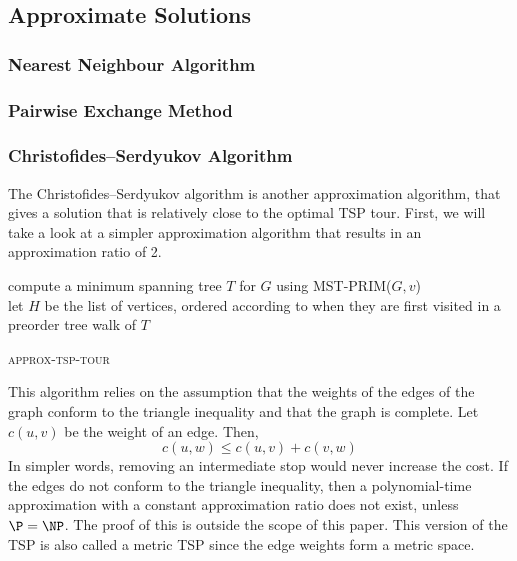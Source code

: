 \documentclass[11pt]{article}
\begin{document}
		
		
	\subsection{ Approximate Solutions}
		\subsubsection {Nearest Neighbour Algorithm}
    \subsubsection {Pairwise Exchange Method}
    \newpage
    \subsubsection {Christofides–Serdyukov Algorithm}
    The Christofides–Serdyukov algorithm is another approximation algorithm, that gives a solution that is 
    relatively close to the optimal TSP tour. First, we will take a look at a simpler approximation 
    algorithm that results in an approximation ratio of 2.

    \begin{algorithm*}
      compute a minimum spanning tree $T$ for $G$ using \textsc{MST-PRIM}($G, v$) \\
      let $H$ be the list of vertices, ordered according to when they are first visited in a
      preorder tree walk of $T$ \\
  \caption{\textsc{approx-tsp-tour}}
  \end{algorithm*}
    
  This algorithm relies on the assumption that the weights of the edges of the graph conform to the triangle inequality and that the graph is complete.
  Let $c(u,v)$ be the weight of 
  an edge. Then, \[c(u,w) \leq c(u,v) + c(v, w) \]
  In simpler words, removing an intermediate stop would never increase the cost. If the edges do not conform to the triangle inequality, then a polynomial-time approximation
  with a constant approximation ratio does not exist, unless $\P = \NP$. The proof of this
  is outside the scope of this paper. This version of the TSP is also called a metric TSP since 
  the edge weights form a metric space.   
\end{document}
